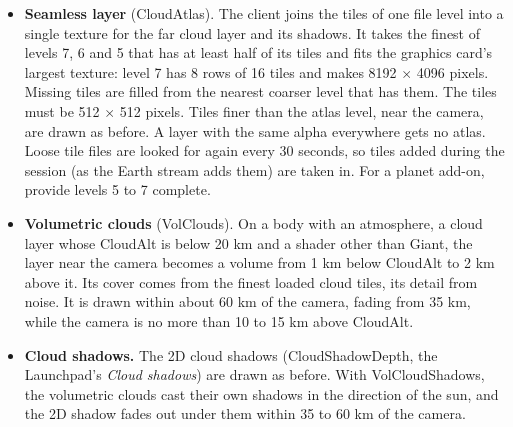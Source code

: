\documentclass[Orbiter Developer Manual.tex]{subfiles}
\begin{document}
\begin{sloppypar}
\begin{itemize}
\item \textbf{Seamless layer} (CloudAtlas). The client joins the tiles of one file level into a single texture for the far cloud layer and its shadows. It takes the finest of levels 7, 6 and 5 that has at least half of its tiles and fits the graphics card's largest texture: level 7 has 8 rows of 16 tiles and makes 8192 $\times$ 4096 pixels. Missing tiles are filled from the nearest coarser level that has them. The tiles must be 512 $\times$ 512 pixels. Tiles finer than the atlas level, near the camera, are drawn as before. A layer with the same alpha everywhere gets no atlas. Loose tile files are looked for again every 30 seconds, so tiles added during the session (as the Earth stream adds them) are taken in. For a planet add-on, provide levels 5 to 7 complete.
\item \textbf{Volumetric clouds} (VolClouds). On a body with an atmosphere, a cloud layer whose CloudAlt is below 20 km and a shader other than Giant, the layer near the camera becomes a volume from 1 km below CloudAlt to 2 km above it. Its cover comes from the finest loaded cloud tiles, its detail from noise. It is drawn within about 60 km of the camera, fading from 35 km, while the camera is no more than 10 to 15 km above CloudAlt.
\item \textbf{Cloud shadows.} The 2D cloud shadows (CloudShadowDepth, the Launchpad's \textit{Cloud shadows}) are drawn as before. With VolCloudShadows, the volumetric clouds cast their own shadows in the direction of the sun, and the 2D shadow fades out under them within 35 to 60 km of the camera.
\end{itemize}


\end{sloppypar}
\end{document}

